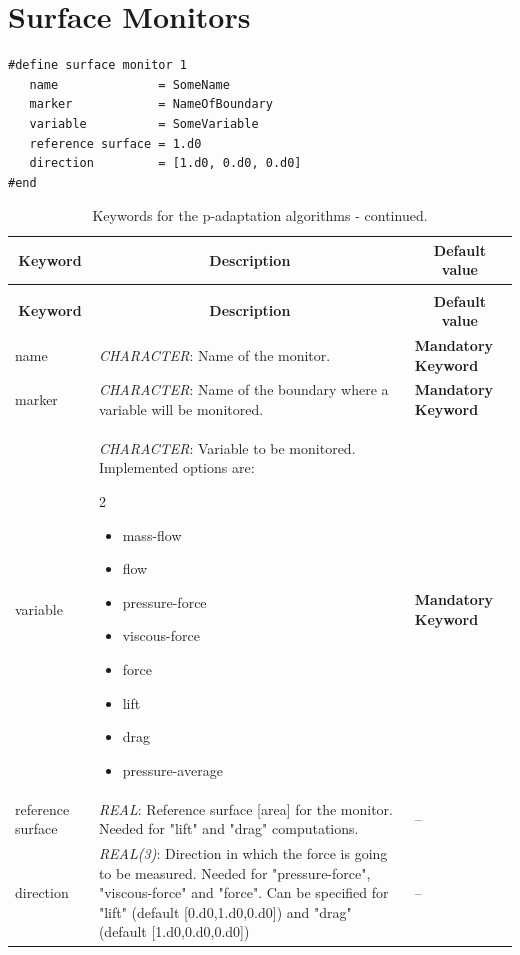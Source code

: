 \documentclass[a4paper,10pt]{report}
\begin{document}

\section{Surface Monitors}


\begin{lstlisting}
#define surface monitor 1
   name              = SomeName
   marker            = NameOfBoundary
   variable          = SomeVariable
   reference surface = 1.d0
   direction         = [1.d0, 0.d0, 0.d0]
#end
\end{lstlisting}

\begin{longtable}{|p{4cm}|p{10cm}|p{2.2cm}|}
\caption{Keywords for probes.} \label{tab:SurfaceMonitorKey} \\
\hline
\multicolumn{1}{|c|}{\textbf{Keyword}} & \multicolumn{1}{c|}{\textbf{Description}} & \multicolumn{1}{c|}{\textbf{Default value}} \\ \hline
\endfirsthead

\caption{Keywords for the p-adaptation algorithms - continued.} \\
\hline
\multicolumn{1}{|c|}{\textbf{Keyword}} & \multicolumn{1}{c|}{\textbf{Description}} & \multicolumn{1}{c|}{\textbf{Default value}} \\ \hline
\endhead

name 	&
			\textit{CHARACTER}: Name of the monitor. &
							\textbf{Mandatory Keyword} \\ \hline

marker &
			\textit{CHARACTER}: Name of the boundary where a variable will be monitored. &
							\textbf{Mandatory Keyword} \\ \hline

variable 	&
			\textit{CHARACTER}: Variable to be monitored. Implemented options are:\
\begin{multicols}{2}
\begin{itemize}
\item mass-flow
\item flow
\item pressure-force
\item viscous-force
\item force
\item lift
\item drag
\item pressure-average
\end{itemize}
\end{multicols}
			 &
							\textbf{Mandatory Keyword} \\ \hline

reference surface 	&
			\textit{REAL}: Reference surface [area] for the monitor. Needed for "lift" and "drag" computations. &
							-- \\ \hline

direction 	&
			\textit{REAL(3)}: Direction in which the force is going to be measured. Needed for "pressure-force", "viscous-force" and "force". Can be specified for "lift" (default [0.d0,1.d0,0.d0]) and "drag" (default [1.d0,0.d0,0.d0])   &
							-- \\ \hline
\end{longtable}
\end{document}
